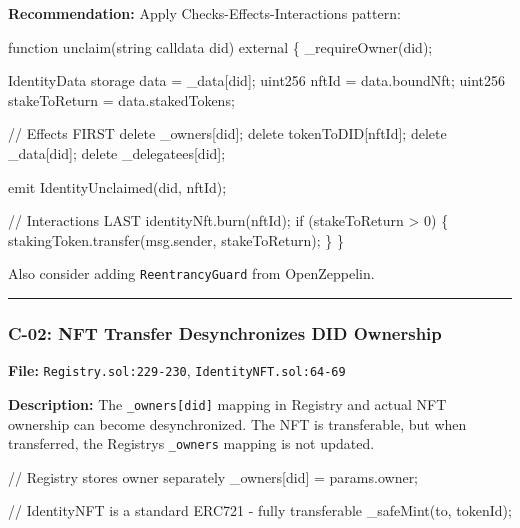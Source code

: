 \documentclass[
]{article}
\newenvironment{Shaded}{}{}
\newcommand{\NormalTok}[1]{#1}
\begin{document}
\textbf{Recommendation:} Apply Checks-Effects-Interactions pattern:

\begin{Shaded}
\begin{Highlighting}[]
\NormalTok{function unclaim(string calldata did) external \{}
\NormalTok{    \_requireOwner(did);}

\NormalTok{    IdentityData storage data = \_data[did];}
\NormalTok{    uint256 nftId = data.boundNft;}
\NormalTok{    uint256 stakeToReturn = data.stakedTokens;}

\NormalTok{    // Effects FIRST}
\NormalTok{    delete \_owners[did];}
\NormalTok{    delete tokenToDID[nftId];}
\NormalTok{    delete \_data[did];}
\NormalTok{    delete \_delegatees[did];}

\NormalTok{    emit IdentityUnclaimed(did, nftId);}

\NormalTok{    // Interactions LAST}
\NormalTok{    identityNft.burn(nftId);}
\NormalTok{    if (stakeToReturn \textgreater{} 0) \{}
\NormalTok{        stakingToken.transfer(msg.sender, stakeToReturn);}
\NormalTok{    \}}
\NormalTok{\}}
\end{Highlighting}
\end{Shaded}

Also consider adding \texttt{ReentrancyGuard} from OpenZeppelin.

\begin{center}\rule{0.5\linewidth}{0.5pt}\end{center}

\subsubsection{C-02: NFT Transfer Desynchronizes DID
Ownership}\label{c-02-nft-transfer-desynchronizes-did-ownership}

\textbf{File:} \texttt{Registry.sol:229-230},
\texttt{IdentityNFT.sol:64-69}

\textbf{Description:} The \texttt{\_owners{[}did{]}} mapping in Registry
and actual NFT ownership can become desynchronized. The NFT is
transferable, but when transferred, the Registry\textquotesingle s
\texttt{\_owners} mapping is not updated.

\begin{Shaded}
\begin{Highlighting}[]
\NormalTok{// Registry stores owner separately}
\NormalTok{\_owners[did] = params.owner;}

\NormalTok{// IdentityNFT is a standard ERC721 {-} fully transferable}
\NormalTok{\_safeMint(to, tokenId);}
\end{Highlighting}
\end{Shaded}
\end{document}
